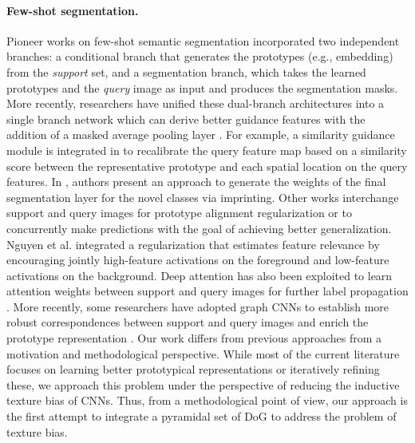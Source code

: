 \documentclass[runningheads]{llncs}
\begin{document}
\paragraph{\textbf{Few-shot segmentation.}} Pioneer works on few-shot semantic segmentation \cite{shaban2017one,dong2018few,rakelly2018conditional} incorporated two independent branches: a conditional branch that generates the prototypes (e.g., embedding) from the \textit{support} set, and a segmentation branch, which takes the learned prototypes and the \textit{query} image as input and produces the segmentation masks. More recently, researchers have unified these dual-branch architectures into a single branch network which can derive better guidance features with the addition of a masked average pooling layer \cite{zhang2018sg,siam2019amp,wang2019panet,nguyen2019feature}. For example, a similarity guidance module is integrated in \cite{zhang2018sg} to recalibrate the query feature map based on a similarity score between the representative prototype and each spatial location on the query features. In \cite{siam2019amp}, authors present an approach to generate the weights of the final segmentation layer for the novel classes via imprinting. 
Other works interchange support and query images for prototype alignment regularization \cite{wang2019panet} or to concurrently make predictions \cite{liu2020crnet} with the goal of achieving better generalization.
Nguyen et al. \cite{nguyen2019feature} integrated a regularization that estimates feature relevance by encouraging jointly high-feature activations on the foreground and low-feature activations on the background. Deep attention has also been exploited to learn attention weights between support and query images for further label propagation \cite{hu2019attention,zhang2019canet}. More recently, some researchers have adopted graph CNNs to establish more robust correspondences between support and query images and enrich the prototype representation \cite{liu2020part,wangfew}. Our work differs from previous approaches from a motivation and methodological perspective. While most of the current literature focuses on learning better prototypical representations or iteratively refining these, we approach this problem under the perspective of reducing the inductive texture bias of CNNs. Thus, from a methodological point of view, our approach is the first attempt to integrate a pyramidal set of DoG to address the problem of texture bias.
\end{document}
